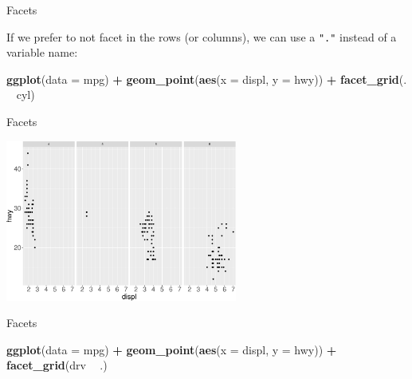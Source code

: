 \documentclass[ignorenonframetext,]{beamer}
\newenvironment{Shaded}{\begin{snugshade}}{\end{snugshade}}
\newcommand{\DataTypeTok}[1]{\textcolor[rgb]{0.13,0.29,0.53}{#1}}
\newcommand{\KeywordTok}[1]{\textcolor[rgb]{0.13,0.29,0.53}{\textbf{#1}}}
\newcommand{\NormalTok}[1]{#1}
\newcommand{\OperatorTok}[1]{\textcolor[rgb]{0.81,0.36,0.00}{\textbf{#1}}}
\newcommand{\StringTok}[1]{\textcolor[rgb]{0.31,0.60,0.02}{#1}}
\begin{document}
\begin{frame}[fragile]{Facets}
\protect\hypertarget{facets-7}{}

If we prefer to not facet in the rows (or columns), we can use a
\texttt{"."} instead of a variable name:

\begin{Shaded}
\begin{Highlighting}[]
\KeywordTok{ggplot}\NormalTok{(}\DataTypeTok{data =}\NormalTok{ mpg) }\OperatorTok{+}\StringTok{ }
\StringTok{  }\KeywordTok{geom_point}\NormalTok{(}\KeywordTok{aes}\NormalTok{(}\DataTypeTok{x =}\NormalTok{ displ, }\DataTypeTok{y =}\NormalTok{ hwy)) }\OperatorTok{+}\StringTok{ }
\StringTok{  }\KeywordTok{facet_grid}\NormalTok{(. }\OperatorTok{~}\StringTok{ }\NormalTok{cyl)}
\end{Highlighting}
\end{Shaded}

\end{frame}

\begin{frame}{Facets}
\protect\hypertarget{facets-8}{}

\begin{center}\includegraphics[height=200px]{data-visualization_files/figure-beamer/unnamed-chunk-77-1} \end{center}

\end{frame}

\begin{frame}[fragile]{Facets}
\protect\hypertarget{facets-9}{}

\begin{Shaded}
\begin{Highlighting}[]
\KeywordTok{ggplot}\NormalTok{(}\DataTypeTok{data =}\NormalTok{ mpg) }\OperatorTok{+}\StringTok{ }
\StringTok{  }\KeywordTok{geom_point}\NormalTok{(}\KeywordTok{aes}\NormalTok{(}\DataTypeTok{x =}\NormalTok{ displ, }\DataTypeTok{y =}\NormalTok{ hwy)) }\OperatorTok{+}
\StringTok{  }\KeywordTok{facet_grid}\NormalTok{(drv }\OperatorTok{~}\StringTok{ }\NormalTok{.)}
\end{Highlighting}
\end{Shaded}

\end{frame}
\end{document}
